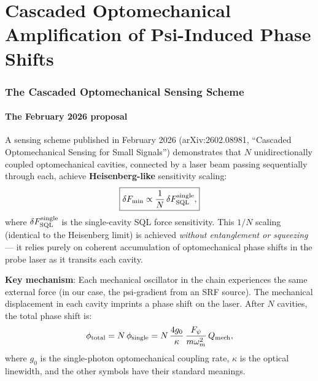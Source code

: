 \documentclass[11pt]{article}
\theoremstyle{definition}
\theoremstyle{remark}
\begin{document}
\part{Cascaded Optomechanical Amplification of Psi-Induced Phase Shifts}
\label{part:cascaded}


\section{The Cascaded Optomechanical Sensing Scheme}
\label{sec:cascaded}

\subsection{The February 2026 proposal}

A sensing scheme published in February 2026 (arXiv:2602.08981,
``Cascaded Optomechanical Sensing for Small Signals'') demonstrates
that $N$ unidirectionally coupled optomechanical cavities, connected
by a laser beam passing sequentially through each, achieve
\textbf{Heisenberg-like} sensitivity scaling:
\begin{equation}
\boxed{
\delta F_{\rm min} \propto \frac{1}{N}\,\delta F_{\rm SQL}^{\rm single},
}
\label{eq:cascaded_scaling}
\end{equation}
where $\delta F_{\rm SQL}^{\rm single}$ is the single-cavity SQL force
sensitivity. This $1/N$ scaling (identical to the Heisenberg limit) is
achieved \emph{without entanglement or squeezing} --- it relies purely
on coherent accumulation of optomechanical phase shifts in the probe
laser as it transits each cavity.

\textbf{Key mechanism}: Each mechanical oscillator in the chain
experiences the same external force (in our case, the psi-gradient
from an SRF source). The mechanical displacement in each cavity
imprints a phase shift on the laser. After $N$ cavities, the total
phase shift is:
\begin{equation}
\phi_{\rm total} = N\,\phi_{\rm single} = N\,\frac{4 g_0}{\kappa}\,
\frac{F_\psi}{m\omega_m^2}\,Q_{\rm mech},
\label{eq:phase_accumulation}
\end{equation}
where $g_0$ is the single-photon optomechanical coupling rate,
$\kappa$ is the optical linewidth, and the other symbols have their
standard meanings.
\end{document}
